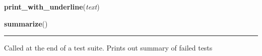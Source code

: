 \hspace{.8\funcindent}\begin{boxedminipage}{\funcwidth}

    \raggedright \textbf{print\_with\_underline}(\textit{text})

\setlength{\parskip}{2ex}
\setlength{\parskip}{1ex}
    \end{boxedminipage}

    \label{datk:core:tester:summarize}

    \vspace{0.5ex}

\hspace{.8\funcindent}\begin{boxedminipage}{\funcwidth}

    \raggedright \textbf{summarize}()

    \vspace{-1.5ex}

    \rule{\textwidth}{0.5\fboxrule}
\setlength{\parskip}{2ex}
    Called at the end of a test suite. Prints out summary of failed tests

\setlength{\parskip}{1ex}
    \end{boxedminipage}

    \label{datk:core:tester:benchmark}

    \vspace{0.5ex}

